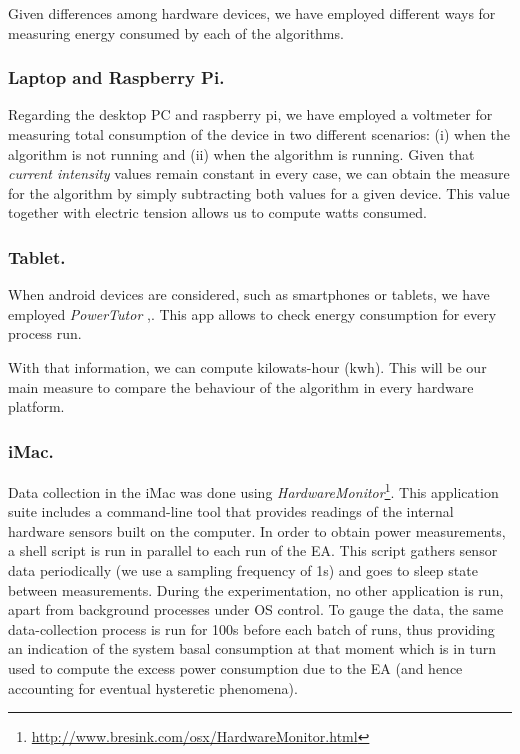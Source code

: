 Given differences among hardware devices, we have employed different ways  %
for measuring energy consumed by each of the algorithms.  

\subsubsection*{Laptop and Raspberry Pi.}
Regarding the desktop PC and raspberry pi, we have employed a voltmeter for measuring total consumption of the device in two different scenarios:  (i) when the algorithm is not running and (ii) when the algorithm is running.  Given that \textit{current intensity} values remain constant in every case, we can obtain the measure for the algorithm by simply subtracting both values for a given device.  This value together with electric tension allows us to compute watts consumed.

\subsubsection*{Tablet.}
When android devices are considered, such as smartphones or tablets, we have employed  \textit{PowerTutor} \cite{powertutor},\cite{powertutor2}. This app allows to check energy consumption for every process run.

With that information, we can compute kilowats-hour (kwh).  This will be our main measure to compare the behaviour of the algorithm in every hardware platform.

\subsubsection*{iMac.}
Data collection in the iMac was done using \emph{HardwareMonitor}\footnote{\url{http://www.bresink.com/osx/HardwareMonitor.html}}. 
This application suite includes a command-line tool that provides readings of the internal
hardware sensors built on the computer. In order to obtain power measurements, a shell
script is run in parallel to each run of the EA. This script gathers sensor data periodically
(we use a sampling frequency of 1s) and goes to sleep state between measurements. 
During the experimentation, no other application is run, apart from background processes 
under OS control. 
To gauge the data,
the same data-collection process is run for 100s before each batch of runs, thus providing
an indication of the system basal consumption at that moment which is in turn used to 
compute the excess power consumption due to the EA (and hence accounting for
eventual hysteretic phenomena).

